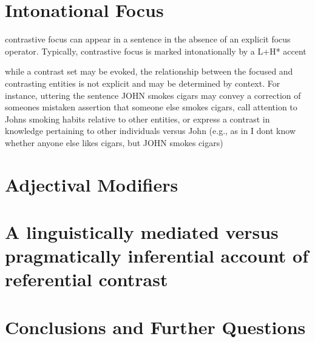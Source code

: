 \documentclass[12pt]{article}
\begin{document}
\section{Intonational Focus}

contrastive focus can appear in a sentence in the absence of an explicit focus operator. Typically, contrastive focus is marked intonationally
by a L+H* accent

while a contrast set may be evoked, the relationship between the focused and
contrasting entities is not explicit and may be determined by context. For
instance, uttering the sentence JOHN smokes cigars may convey a correction
of someones mistaken assertion that someone else smokes cigars, call attention
to Johns smoking habits relative to other entities, or express a contrast
in knowledge pertaining to other individuals versus John (e.g., as in I dont
know whether anyone else likes cigars, but JOHN smokes cigars)


\section{Adjectival Modifiers}

\section{A linguistically mediated versus pragmatically inferential account of referential contrast}

\section{Conclusions and Further Questions}
\end{document}
